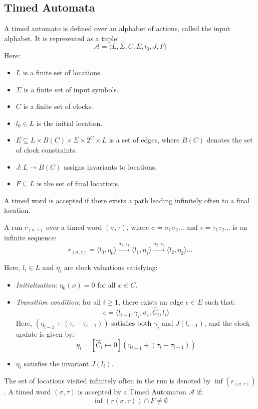 \subsection{Timed Automata}
A timed automato is defined over an alphabet of actions, called the input alphabet. 
It is represented as a tuple:
\[\mathcal{A} = \langle L, \Sigma, C, E, l_0, J, F \rangle\]
\noindent Here:
\begin{itemize}
    \item $L$ is a finite set of locations.
    \item $\Sigma$ is a finite set of input symbols.
    \item $C$ is a finite set of clocks.
    \item $l_0 \in L$ is the initial location.
    \item $E \subseteq L \times B(C) \times \Sigma \times 2^C \times L$ is a set of edges, where $B(C)$ denotes the set of clock constraints.
    \item $J: L \to B(C)$ assigns invariants to locations.
    \item $F \subseteq L$ is the set of final locations.
\end{itemize}
\noindent A timed word is accepted if there exists a path leading infinitely often to a final location.

\begin{definition}
    A run $r_{(\sigma, \tau)}$ over a timed word $(\sigma, \tau)$, where $\sigma = \sigma_1 \sigma_2 \dots$ and $\tau = \tau_1 \tau_2 \dots$ is an infinite sequence:
    \[r_{(\sigma, \tau)} = \langle l_0, \eta_0 \rangle \xrightarrow{\sigma_1, \tau_1} \langle l_1, \eta_1 \rangle \xrightarrow{\sigma_2, \tau_2} \langle l_2, \eta_2 \rangle \dots\]
\end{definition}

Here, $l_i \in L$ and $\eta_i$ are clock valuations satisfying:
\begin{itemize}
    \item \textit{Initialization}: $\eta_0(x) = 0$ for all $x \in C$.
    \item \textit{Transition condition}: for all $i \geq 1$, there exists an edge $e \in E$ such that:
        \[e = \langle l_{i-1}, \gamma_i, \sigma_i, \hat{C}_i, l_i \rangle\]
        Here, $(\eta_{i-1} + (\tau_i - \tau_{i-1}))$ satisfies both $\gamma_i$ and $J(l_{i-1})$, and the clock update is given by:
        \[\eta_i = [\hat{C}_i \mapsto  0](\eta_{i-1} + (\tau_i - \tau_{i-1}))\]
    \item $\eta_i$ satisfies the invariant $J(l_i)$.
\end{itemize}
\noindent The set of locations visited infinitely often in the run is denoted by $\inf(r_{(\sigma, \tau)})$.
A timed word $(\sigma, \tau)$ is accepted by a Timed Automaton $\mathcal{A}$ if:
\[\inf(r(\sigma, \tau)) \cap F \neq \emptyset\]

